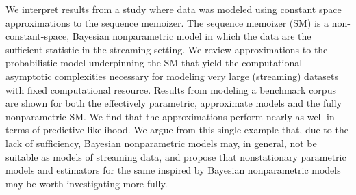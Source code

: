 
We interpret results from a study where data was modeled using constant space approximations to the sequence memoizer.   The sequence memoizer (SM) is a non-constant-space, Bayesian nonparametric model in which the data are the sufficient statistic in the streaming setting.  We review approximations to the probabilistic model underpinning the SM that yield the computational asymptotic complexities necessary for modeling very large (streaming) datasets with fixed computational resource. Results from modeling a benchmark corpus are shown for both the effectively parametric, approximate models and the fully nonparametric SM.  We find that the approximations perform nearly as well in terms of predictive likelihood.  We argue from this single example that, due to the lack of sufficiency, Bayesian nonparametric models may, in general, not be suitable as models of streaming data, and propose that  nonstationary parametric models and estimators for the same  inspired by Bayesian nonparametric models may be worth investigating more fully.


